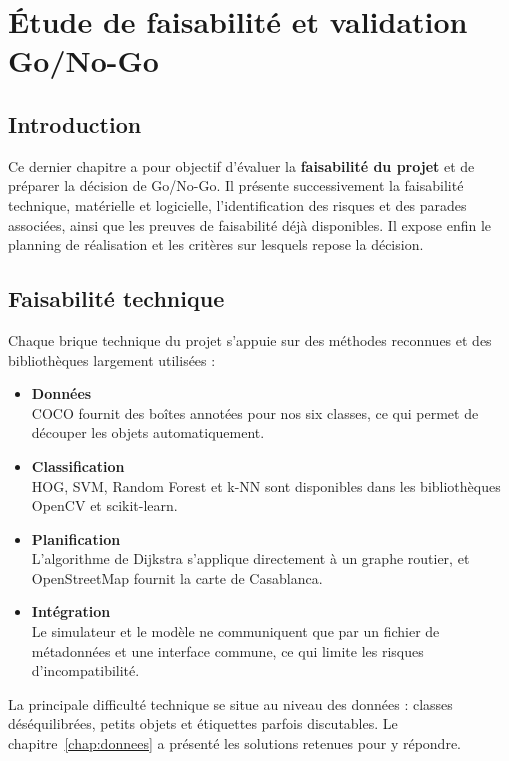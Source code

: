 \chapter{Étude de faisabilité et validation Go/No-Go}
\label{chap:faisabilite}

\section{Introduction}

Ce dernier chapitre a pour objectif d'évaluer la \textbf{faisabilité du projet} et de préparer la décision de Go/No-Go. Il présente successivement la faisabilité technique, matérielle et logicielle, l'identification des risques et des parades associées, ainsi que les preuves de faisabilité déjà disponibles. Il expose enfin le planning de réalisation et les critères sur lesquels repose la décision.

\section{Faisabilité technique}

Chaque brique technique du projet s'appuie sur des méthodes reconnues et des bibliothèques largement utilisées :

\begin{itemize}
  \item \textbf{Données}\\
  COCO fournit des boîtes annotées pour nos six classes, ce qui permet de découper les objets automatiquement.
  \item \textbf{Classification}\\
  HOG, SVM, Random Forest et k-NN sont disponibles dans les bibliothèques OpenCV et scikit-learn.
  \item \textbf{Planification}\\
  L'algorithme de Dijkstra s'applique directement à un graphe routier, et OpenStreetMap fournit la carte de Casablanca.
  \item \textbf{Intégration}\\
  Le simulateur et le modèle ne communiquent que par un fichier de métadonnées et une interface commune, ce qui limite les risques d'incompatibilité.
\end{itemize}

La principale difficulté technique se situe au niveau des données : classes déséquilibrées, petits objets et étiquettes parfois discutables. Le chapitre~\ref{chap:donnees} a présenté les solutions retenues pour y répondre.

